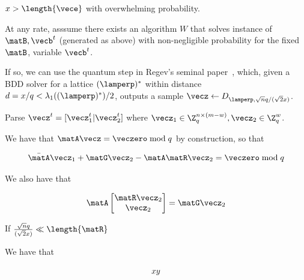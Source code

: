  $x > \length{\vece}$ with overwhelming probability.  



 At any rate, asssume there exists an algorithm $W$ that solves instance of $\matB, \vecb^t$ (generated as above) with non-negligible probability for the fixed $\matB$, variable $\vecb^t$. 






If so, we can use the quantum step in Regev's seminal paper~\cite{DBLP:journals/jacm/Regev09}, which, given a BDD solver for a lattice $(\lamperp)^*$ within distance $d = x/q < \lambda_1((\lamperp)^*)/2$, outputs a sample $\vecz \gets D_{\lamperp, \sqrt{n}q/(\sqrt{2}x)}$.  

Parse $\vecz^t = [\vecz_1^t | \vecz_2^t]$ where $\vecz_1 \in \Z_q^{n \times (m-w)}, \vecz_2 \in \Z_q^w$. 


We have that $\matA\vecz = \veczero \bmod{q}$ by construction, so that 


\[\bar{\matA}\vecz_1 + \matG\vecz_2 - \matA\matR\vecz_2 = \veczero \bmod{q}\]


We also have that 

\[\matA\begin{bmatrix}\matR\vecz_2\\\vecz_2\\\end{bmatrix} = \matG\vecz_2\]


If $\tfrac{\sqrt{n}q}{(\sqrt{2}x)} \ll \length{\matR}$ 


We have that 

\begin{equation*}
    x\\
    y\\
\end{equation*}






